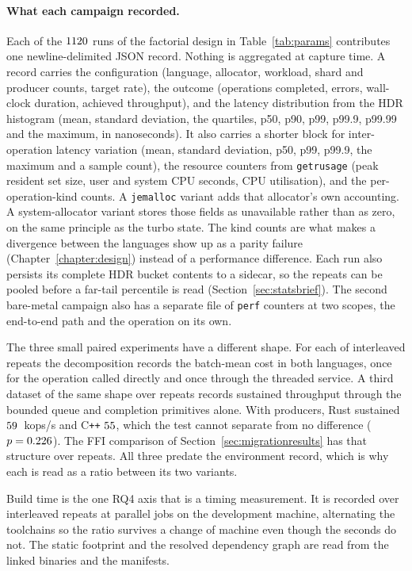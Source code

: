 \documentclass[english,oneside,a4paper,censored,csm,software-track-2020]{HYthesisML}
\begin{document}
\begin{appendices}
\FloatBarrier
\paragraph{What each campaign recorded.}
Each of the $1120$ runs of the factorial design in Table~\ref{tab:params} contributes one
newline-delimited JSON record. Nothing is aggregated at capture time. A record carries the
configuration (language, allocator, workload, shard and producer counts, target rate), the
outcome (operations completed, errors, wall-clock duration, achieved throughput), and the
latency distribution from the HDR histogram (mean, standard deviation, the quartiles, p50, p90,
p99, p99.9, p99.99 and the maximum, in nanoseconds). It also carries a shorter block for
inter-operation latency variation (mean, standard deviation, p50, p99, p99.9, the maximum and a
sample count), the resource counters from \texttt{getrusage} (peak resident set size, user and
system CPU seconds, CPU utilisation), and the per-operation-kind counts. A \texttt{jemalloc}
variant adds that allocator's own accounting. A system-allocator variant stores those fields as
unavailable rather than as zero, on the same principle as the turbo state.
The kind counts are what makes a divergence between the languages show up as a parity failure
(Chapter~\ref{chapter:design}) instead of a performance difference. Each run also persists its
complete HDR bucket contents to a sidecar, so the repeats can be pooled before a far-tail
percentile is read (Section~\ref{sec:statsbrief}). The second bare-metal campaign also has a
separate file of \texttt{perf} counters at two scopes, the end-to-end path and the operation on
its own.

The three small paired experiments have a different shape. For each of \BudgetRepeats{}
interleaved repeats the decomposition records the batch-mean cost in both languages, once for
the operation called directly and once through the threaded service. A third dataset of the same
shape over \ContentionRepeats{} repeats records sustained throughput through the bounded queue and
completion primitives alone. With \ContentionProducers{} producers, Rust sustained
$59$~kops/s and C\texttt{++} $55$, which the test cannot separate
from no difference ($p = 0.226$). The FFI comparison of
Section~\ref{sec:migrationresults} has that structure over \FfiOpRepeats{} repeats. All three
predate the environment record, which is why each is read as a ratio between its two variants.

Build time is the one RQ4 axis that is a timing measurement. It is recorded over
\AdoptRepeats{} interleaved repeats at \AdoptJobs{} parallel jobs on the development machine,
alternating the toolchains so the ratio survives a change of machine even though the seconds do
not. The static footprint and the resolved dependency graph are read from the linked binaries
and the manifests.


\end{appendices}
\end{document}
